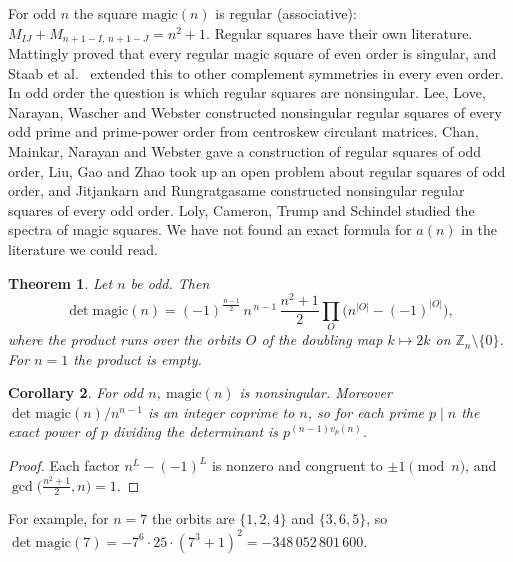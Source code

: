 \documentclass[11pt]{amsart}
\newtheorem{theorem}{Theorem}
\newtheorem{corollary}[theorem]{Corollary}
\theoremstyle{remark}
\newcommand{\Z}{\mathbb{Z}}
\begin{document}
For odd $n$ the square $\mathrm{magic}(n)$ is regular (associative): $M_{IJ}+M_{n+1-I,\,n+1-J}=n^2+1$. Regular
squares have their own literature. Mattingly \cite{mattingly} proved that every regular magic square of even order
is singular, and Staab et al.\ \cite{staab} extended this to other complement symmetries in every even order. In odd
order the question is which regular squares are nonsingular. Lee, Love, Narayan, Wascher and Webster \cite{llnww}
constructed nonsingular regular squares of every odd prime and prime-power order from centroskew circulant
matrices. Chan, Mainkar, Narayan and Webster \cite{cmnw} gave a construction of regular squares of odd order, Liu,
Gao and Zhao \cite{lgz} took up an open problem about regular squares of odd order, and Jitjankarn and
Rungratgasame \cite{jr} constructed nonsingular regular squares of every odd order. Loly, Cameron, Trump and
Schindel \cite{lcts} studied the spectra of magic squares. We have not found an exact formula for $a(n)$ in the
literature we could read.

\begin{theorem}\label{thm:main}
Let $n$ be odd. Then
\[
\det \mathrm{magic}(n) = (-1)^{\frac{n-1}{2}}\, n^{\,n-1}\,\frac{n^2+1}{2}\prod_{O}\bigl(n^{|O|}-(-1)^{|O|}\bigr),
\]
where the product runs over the orbits $O$ of the doubling map $k\mapsto 2k$ on $\Z_n\setminus\{0\}$. For $n=1$ the
product is empty.
\end{theorem}

\begin{corollary}
For odd $n$, $\mathrm{magic}(n)$ is nonsingular. Moreover $\det\mathrm{magic}(n)/n^{n-1}$ is an integer coprime to
$n$, so for each prime $p\mid n$ the exact power of $p$ dividing the determinant is $p^{(n-1)v_p(n)}$.
\end{corollary}

\begin{proof}
Each factor $n^{L}-(-1)^{L}$ is nonzero and congruent to $\pm1 \pmod n$, and $\gcd\bigl(\tfrac{n^2+1}{2},n\bigr)=1$.
\end{proof}

For example, for $n=7$ the orbits are $\{1,2,4\}$ and $\{3,6,5\}$, so
$\det\mathrm{magic}(7) = -7^6\cdot 25\cdot (7^3+1)^2 = -348\,052\,801\,600$.
\end{document}
